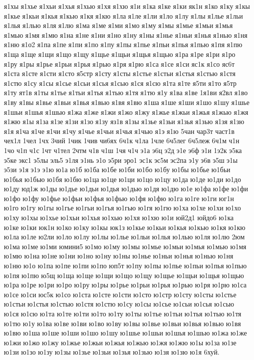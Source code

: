 {я1хы
я1хье
я1хьи
я1хья
я1хью
я1хя
я1хю
я1и
я1ка
я1ке
я1ки
як1н
я1ко
я1ку
я1кы
я1кье
я1кьи
я1кья
я1кью
я1кя
я1кю
я1ла
я1ле
я1ли
я1ло
я1лу
я1лы
я1лье
я1льи
я1лья
я1лью
я1ля
я1лю
я1ма
я1ме
я1ми
я1мо
я1му
я1мы
я1мье
я1мьи
я1мья
я1мью
я1мя
я1мю
я1на
я1не
я1ни
я1но
я1ну
я1ны
я1нье
я1ньи
я1нья
я1нью
я1ня
я1ню
я1о2
я1па
я1пе
я1пи
я1по
я1пу
я1пы
я1пье
я1пьи
я1пья
я1пью
я1пя
я1пю
я1ща
я1ще
я1щи
я1що
я1щу
я1щье
я1щьи
я1щья
я1щью
я1ра
я1ре
я1ри
я1ро
я1ру
я1ры
я1рье
я1рьи
я1рья
я1рью
я1ря
я1рю
я1са
я1се
я1си
яс1к
я1со
яс6т
я1ста
я1сте
я1сти
я1сто
я5стр
я1сту
я1сты
я1стье
я1стьи
я1стья
я1стью
я1стя
я1стю
я1су
я1сы
я1сье
я1сьи
я1сья
я1сью
я1ся
я1сю
я1та
я1те
я5ти
я1то
я5тр
я1ту
ят1в
я1ты
я1тье
я1тьи
я1тья
я1тью
я1тя
я1тю
я1у
я1ва
я1ве
1я1ви
я2вл
я1во
я1ву
я1вы
я1вье
я1вьи
я1вья
я1вью
я1вя
я1вю
я1ша
я1ше
я1ши
я1шо
я1шу
я1шье
я1шьи
я1шья
я1шью
я1жа
я1же
я1жи
я1жо
я1жу
я1жье
я1жьи
я1жья
я1жью
я1жя
я1жю
я1ы
я1за
я1зе
я1зи
я1зо
я1зу
яз1в
я1зы
я1зье
я1зьи
я1зья
я1зью
я1зя
я1зю
я1я
я1ча
я1че
я1чи
я1чу
я1чье
я1чьи
я1чья
я1чью
я1э
я1ю
5чан
чар3т
част1в
чех1л
1чел
1чх
3чий
1чик
1чив
чи6ях
6ч1к
ч1ла
1чле
6ч5лег
6ч5леж
6ч1м
ч1н
1чо
ч1п
ч1с
1чт
ч1тел
2чтм
ч1в
ч1ш
1чя
ч1ч
э1а
э6ц
э2д
э1е
э6ф
э1и
1э2к
э5ка
э5ке
экс1
э5лы
эль5
э1ля
э1нь
э1о
э5ри
эро1
эс1к
эс5м
эс2па
э1у
э6в
э5ш
э1ы
э5зи
э1я
э1э
э1ю
ю1а
ю1б
ю1ба
ю1бе
ю1би
ю1бо
ю1бу
ю1бы
ю1бье
ю1бьи
ю1бья
ю1бью
ю1бя
ю1бю
ю1ца
ю1це
ю1ци
ю1цо
ю1цу
ю1да
ю1де
ю1ди
ю1до
ю1ду
юд1ж
ю1ды
ю1дье
ю1дьи
ю1дья
ю1дью
ю1дя
ю1дю
ю1е
ю1фа
ю1фе
ю1фи
ю1фо
ю1фу
ю1фье
ю1фьи
ю1фья
ю1фью
ю1фя
ю1фю
ю1га
ю1ге
ю1ги
юг1н
ю1го
ю1гу
ю1гы
ю1гье
ю1гьи
ю1гья
ю1гью
ю1гя
ю1гю
ю1ха
ю1хе
ю1хи
ю1хо
ю1ху
ю1хы
ю1хье
ю1хьи
ю1хья
ю1хью
ю1хя
ю1хю
ю1и
юй2д1
юйдо6
ю1ка
ю1ке
ю1ки
юк1н
ю1ко
ю1ку
ю1кы
юк1з
ю1кье
ю1кьи
ю1кья
ю1кью
ю1кя
ю1кю
ю1ла
ю1ле
ю2ли
ю1ло
ю1лу
ю1лы
ю1лье
ю1льи
ю1лья
ю1лью
ю1ля
ю1лю
2юм
ю1ма
ю1ме
ю1ми
юмини5
ю1мо
ю1му
ю1мы
ю1мье
ю1мьи
ю1мья
ю1мью
ю1мя
ю1мю
ю1на
ю1не
ю1ни
ю1но
ю1ну
ю1ны
ю1нье
ю1ньи
ю1нья
ю1нью
ю1ня
ю1ню
ю1о
ю1па
ю1пе
ю1пи
ю1по
юп5т
ю1пу
ю1пы
ю1пье
ю1пьи
ю1пья
ю1пью
ю1пя
ю1пю
ю5щ
ю1ща
ю1ще
ю1щи
ю1що
ю1щу
ю1щье
ю1щьи
ю1щья
ю1щью
ю1ра
ю1ре
ю1ри
ю1ро
ю1ру
ю1ры
ю1рье
ю1рьи
ю1рья
ю1рью
ю1ря
ю1рю
ю1са
ю1се
ю1си
юс5к
ю1со
ю1ста
ю1сте
ю1сти
ю1сто
ю1стр
ю1сту
ю1сты
ю1стье
ю1стьи
ю1стья
ю1стью
ю1стя
ю1стю
ю1су
ю1сы
ю1сье
ю1сьи
ю1сья
ю1сью
ю1ся
ю1сю
ю1та
ю1те
ю1ти
ю1то
ю1ту
ю1ты
ю1тье
ю1тьи
ю1тья
ю1тью
ю1тя
ю1тю
ю1у
ю1ва
ю1ве
ю1ви
ю1во
ю1ву
ю1вы
ю1вье
ю1вьи
ю1вья
ю1вью
ю1вя
ю1вю
ю1ша
ю1ше
ю1ши
ю1шо
ю1шу
ю1шье
ю1шьи
ю1шья
ю1шью
ю1жа
ю1же
ю1жи
ю1жо
ю1жу
ю1жье
ю1жьи
ю1жья
ю1жью
ю1жя
ю1жю
ю1ы
ю1за
ю1зе
ю1зи
ю1зо
ю1зу
ю1зы
ю1зье
ю1зьи
ю1зья
ю1зью
ю1зя
ю1зю
ю1я
6хуй.
}
